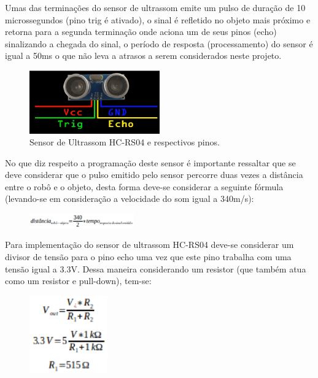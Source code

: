 Umas das terminações do sensor de ultrassom emite um pulso de duração de 10 microssegundos (pino trig é ativado), o sinal é refletido no objeto mais próximo e retorna para a segunda terminação onde aciona um de seus pinos (echo) sinalizando a chegada do sinal, o período de resposta (processamento) do sensor é igual a 50ms o que não leva a atrasos a serem considerados neste projeto.

\begin{figure}[H]
    \centering
    \includegraphics[width=0.5\textwidth]{figuras/pinos_ultrassom.eps}
    \caption{Sensor de Ultrassom HC-RS04 e respectivos pinos.}
    \label{fig:pinos_ultrassom}
\end{figure}

No que diz respeito a programação deste sensor é importante ressaltar que se deve considerar que o pulso emitido pelo sensor percorre duas vezes a distância entre o robô e o objeto, desta forma deve-se considerar a seguinte fórmula (levando-se em consideração a velocidade do som igual a 340m/s):

\begin{figure}[H]
    \centering
    \includegraphics[width=0.4\textwidth]{figuras/distancia.eps}
    \caption{}
    \label{fig:catia01}
\end{figure}

Para implementação do sensor de ultrassom HC-RS04 deve-se considerar um divisor de tensão para o pino echo uma vez que este pino trabalha com uma tensão igual a 3.3V. Dessa maneira considerando um resistor  (que também atua como um resistor e pull-down), tem-se:

\begin{figure}[H]
    \centering
    \includegraphics[width=0.3\textwidth]{figuras/vout.eps}
    \caption{}
    \label{fig:catia01}
\end{figure}

